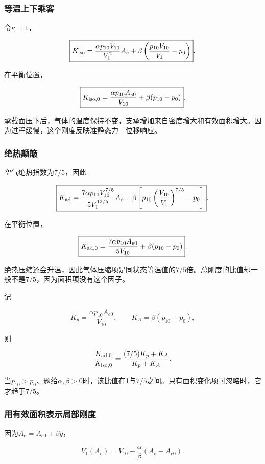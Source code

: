 \documentclass[12pt,a4paper,fontset=fandol]{ctexart}
\begin{document}
\subsubsection{等温上下乘客}\label{ux7b49ux6e29ux4e0aux4e0bux4e58ux5ba2}

令\(\kappa=1\)，

\[
\boxed{
K_{\rm iso}
=\frac{\alpha p_{10}V_{10}}{V_1^2}A_e
+\beta\left(\frac{p_{10}V_{10}}{V_1}-p_0\right)}.
\]

在平衡位置，

\[
\boxed{
K_{{\rm iso},0}
=\frac{\alpha p_{10}A_{e0}}{V_{10}}
+\beta(p_{10}-p_0)}.
\]

承载面压下后，气体的温度保持不变，支承增加来自密度增大和有效面积增大。因为过程缓慢，这个刚度反映准静态力---位移响应。

\subsubsection{绝热颠簸}\label{ux7eddux70edux98a0ux7c38}

空气绝热指数为\(7/5\)，因此

\[
\boxed{
K_{\rm ad}
=\frac{7\alpha p_{10}V_{10}^{7/5}}
{5V_1^{12/5}}A_e
+\beta\left[
p_{10}\left(\frac{V_{10}}{V_1}\right)^{7/5}-p_0
\right]}.
\]

在平衡位置，

\[
\boxed{
K_{{\rm ad},0}
=\frac{7\alpha p_{10}A_{e0}}{5V_{10}}
+\beta(p_{10}-p_0)}.
\]

绝热压缩还会升温，因此气体压缩项是同状态等温值的\(7/5\)倍。总刚度的比值却一般不是\(7/5\)，因为面积项没有这个因子。

记

\[
K_p=\frac{\alpha p_{10}A_{e0}}{V_{10}},
\qquad K_A=\beta(p_{10}-p_0),
\]

则

\[
\frac{K_{{\rm ad},0}}{K_{{\rm iso},0}}
=\frac{(7/5)K_p+K_A}{K_p+K_A}.
\]

当\(p_{10}>p_0\)、题给\(\alpha,\beta>0\)时，该比值在1与\(7/5\)之间。只有面积变化项可忽略时，它才趋于\(7/5\)。

\subsubsection{用有效面积表示局部刚度}\label{ux7528ux6709ux6548ux9762ux79efux8868ux793aux5c40ux90e8ux521aux5ea6}

因为\(A_e=A_{e0}+\beta y\)，

\[
V_1(A_e)=V_{10}
-\frac{\alpha}{\beta}(A_e-A_{e0}).
\]
\end{document}
